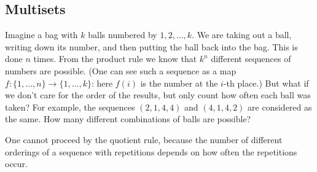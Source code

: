 

\setcounter{section}{3}
\setcounter{subsection}{6}
\setcounter{dfn}{13}

\subsection{Multisets}
Imagine a bag with $k$ balls numbered by $1, 2, \ldots, k$.
We are taking out a ball, writing down its number, and then putting the ball back into the bag.
This is done $n$ times.
From the product rule we know that $k^n$ different sequences of numbers are possible.
(One can see such a sequence as a map $f \colon \{1, \ldots, n\} \to \{1, \ldots, k\}$: here $f(i)$ is the number at the $i$-th place.)
But what if we don't care for the order of the results, but only count how often each ball was taken?
For example, the sequences $(2, 1, 4, 4)$ and $(4, 1, 4, 2)$ are considered as the same.
How many different combinations of balls are possible?

One cannot proceed by the quotient rule, because the number of different orderings of a sequence with repetitions depends on how often the repetitions occur.


